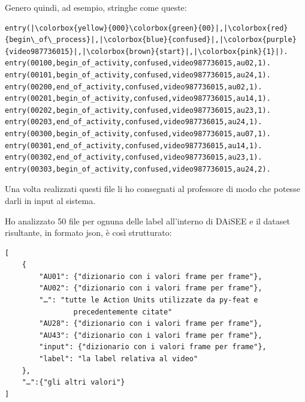 Genero quindi, ad esempio, stringhe come queste:
\begin{verbatim}
entry(|\colorbox{yellow}{000}\colorbox{green}{00}|,|\colorbox{red}{begin\_of\_process}|,|\colorbox{blue}{confused}|,|\colorbox{purple}{video987736015}|,|\colorbox{brown}{start}|,|\colorbox{pink}{1}|).
entry(00100,begin_of_activity,confused,video987736015,au02,1).
entry(00101,begin_of_activity,confused,video987736015,au24,1).
entry(00200,end_of_activity,confused,video987736015,au02,1).
entry(00201,begin_of_activity,confused,video987736015,au14,1).
entry(00202,begin_of_activity,confused,video987736015,au23,1).
entry(00203,end_of_activity,confused,video987736015,au24,1).
entry(00300,begin_of_activity,confused,video987736015,au07,1).
entry(00301,end_of_activity,confused,video987736015,au14,1).
entry(00302,end_of_activity,confused,video987736015,au23,1).
entry(00303,begin_of_activity,confused,video987736015,au24,2).
\end{verbatim}

Una volta realizzati questi file li ho consegnati al professore di modo che potesse darli in input al sistema.

Ho analizzato 50 file per ognuna delle label all’interno di DAiSEE e il dataset risultante, in formato json, è così strutturato:
\begin{verbatim}
[
    {
        "AU01": {"dizionario con i valori frame per frame"},
        "AU02": {"dizionario con i valori frame per frame"},
        "…": "tutte le Action Units utilizzate da py-feat e 
                precedentemente citate"
        "AU28": {"dizionario con i valori frame per frame"},
        "AU43": {"dizionario con i valori frame per frame"},
        "input": {"dizionario con i valori frame per frame"},
        "label": "la label relativa al video"
    },
    "…":{"gli altri valori"}
]
\end{verbatim}

